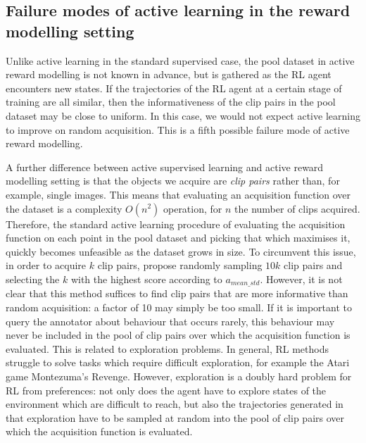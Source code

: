 \documentclass[11pt, a4paper, bibliography=totoc]{report}
\newcommand{\rp}{\hat{r}}
\begin{document}
\subsection{Failure modes of active learning in the reward modelling setting}
Unlike active learning in the standard supervised case, the pool dataset in active reward modelling is not known in advance, but is gathered as the RL agent encounters new states. If the trajectories of the RL agent at a certain stage of training are all similar, then the informativeness of the clip pairs in the pool dataset may be close to uniform. In this case, we would not expect active learning to improve on random acquisition. This is a fifth possible failure mode of active reward modelling.

A further difference between active supervised learning and active reward modelling setting is that the objects we acquire are \textit{clip pairs} rather than, for example, single images. This means that evaluating an acquisition function over the dataset is a complexity $ O(n^2) $ operation, for $ n $ the number of clips acquired. Therefore, the standard active learning procedure of evaluating the acquisition function on each point in the pool dataset and picking that which maximises it, quickly becomes unfeasible as the dataset grows in size. To circumvent this issue, in order to acquire $ k $ clip pairs, \cite{Christiano2017} propose randomly sampling $ 10k $ clip pairs and selecting the $ k $ with the highest score according to $ a_{mean\_std} $. However, it is not clear that this method suffices to find clip pairs that are more informative than random acquisition: a factor of 10 may simply be too small. If it is important to query the annotator about behaviour that occurs rarely, this behaviour may never be included in the pool of clip pairs over which the acquisition function is evaluated. This is related to exploration problems. In general, RL methods struggle to solve tasks which require difficult exploration, for example the Atari game Montezuma's Revenge. However, exploration is a doubly hard problem for RL from preferences: not only does the agent have to explore states of the environment which are difficult to reach, but also the trajectories generated in that exploration have to be sampled at random into the pool of clip pairs over which the acquisition function is evaluated.
\end{document}
